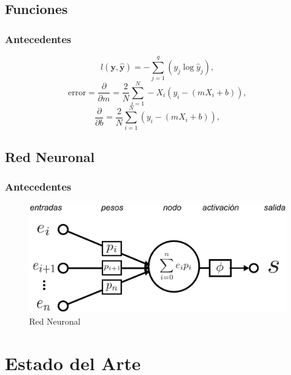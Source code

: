 \documentclass{beamer}
\begin{document}
\subsection{Funciones}
\begin{frame}
\frametitle{Antecedentes}
    \begin{equation}
        l(\mathbf{y}, \hat{\mathbf{y}}) = - \sum_{j=1}^q (y_j \log \hat{y}_j),     
    \end{equation}
    \begin{equation}
        \text{error} = \frac{\partial}{\partial m} = \frac{2}{N}\sum_{i=1}^{N}-X_i(y_i-(mX_i+b)),
    \end{equation}
    \begin{equation}
            \frac{\partial}{\partial b} = \frac{2}{N}\sum_{i=1}^{N}(y_i-(mX_i+b)),
    \end{equation}
\end{frame}

\subsection{Red Neuronal}
\begin{frame}
    \frametitle{Antecedentes}
    \begin{figure}
        \centering
        \includegraphics[scale=0.3]{Figuras/neural_network.eps}
        \caption{Red Neuronal}    
    \end{figure}
\end{frame}

\section{Estado del Arte}
\end{document}
